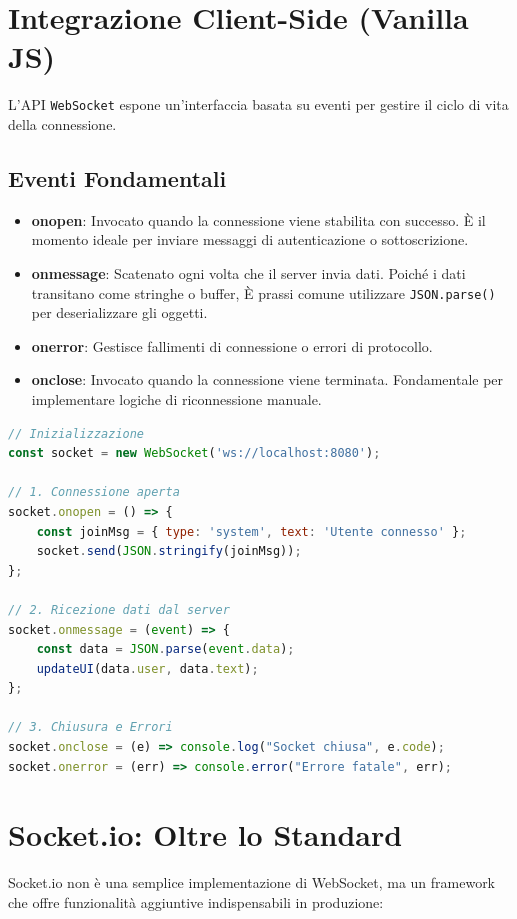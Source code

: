 \documentclass[11pt,a4paper]{report}
\begin{document}
\section{Integrazione Client-Side (Vanilla JS)}
L'API \texttt{WebSocket} espone un'interfaccia basata su eventi per gestire il ciclo di vita della connessione.

\subsection{Eventi Fondamentali}
\begin{itemize}
    \item \textbf{onopen}: Invocato quando la connessione viene stabilita con successo. \`E il momento ideale per inviare messaggi di autenticazione o sottoscrizione.
    \item \textbf{onmessage}: Scatenato ogni volta che il server invia dati. Poich\'e i dati transitano come stringhe o buffer, \`E prassi comune utilizzare \texttt{JSON.parse()} per deserializzare gli oggetti.
    \item \textbf{onerror}: Gestisce fallimenti di connessione o errori di protocollo.
    \item \textbf{onclose}: Invocato quando la connessione viene terminata. Fondamentale per implementare logiche di riconnessione manuale.
\end{itemize}

\begin{lstlisting}[language=javascript, caption=Esempio Client WebSocket Completo]
// Inizializzazione
const socket = new WebSocket('ws://localhost:8080');

// 1. Connessione aperta
socket.onopen = () => {
    const joinMsg = { type: 'system', text: 'Utente connesso' };
    socket.send(JSON.stringify(joinMsg));
};

// 2. Ricezione dati dal server
socket.onmessage = (event) => {
    const data = JSON.parse(event.data);
    updateUI(data.user, data.text);
};

// 3. Chiusura e Errori
socket.onclose = (e) => console.log("Socket chiusa", e.code);
socket.onerror = (err) => console.error("Errore fatale", err);
\end{lstlisting}

\section{Socket.io: Oltre lo Standard}
Socket.io non è una semplice implementazione di WebSocket, ma un framework che offre funzionalità aggiuntive indispensabili in produzione:
\end{document}
